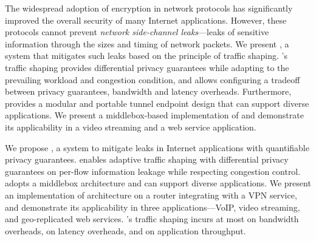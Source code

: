 
The widespread adoption of encryption in network protocols has significantly
improved the overall security of many Internet applications. However, these
protocols cannot prevent {\em network side-channel leaks}---leaks of sensitive
information through the sizes and timing of network packets. We present {\sys},
a system that mitigates such leaks based on the principle of traffic shaping.
{\sys}’s traffic shaping provides differential privacy guarantees while adapting
to the prevailing workload and congestion condition, and allows configuring a
tradeoff between privacy guarantees, bandwidth and latency overheads.
Furthermore, {\sys} provides a modular and portable tunnel endpoint design that
can support diverse applications. We present a middlebox-based implementation of
{\sys} and demonstrate its applicability in a video streaming and a web service
application.



We propose {\sys}, a system to mitigate {\nsca} leaks in Internet applications
with quantifiable privacy guarantees. {\sys} enables adaptive traffic shaping
with differential privacy guarantees on per-flow information leakage while
respecting congestion control. {\sys} adopts a middlebox architecture and can
support diverse applications.  We present an implementation of {\sys}
architecture on a router integrating with a VPN service, and demonstrate its
applicability in three applications---VoIP, video streaming, and geo-replicated
web services.  {\sys}'s traffic shaping incurs at most  on bandwidth
overheads,  on latency overheads, and  on application
throughput.
\fi